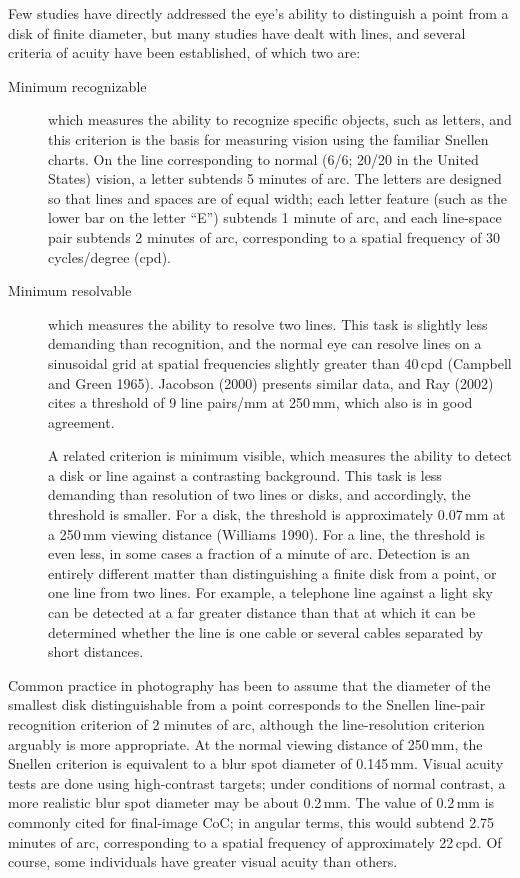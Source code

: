 \documentclass[11pt, oneside]{scrartcl}   	%
\begin{document}
Few studies have directly addressed the eye’s ability to distinguish a point from a disk of finite diameter, but many studies have dealt with lines, and several criteria of acuity have been established, of which two are:
\begin{description}
\item [Minimum recognizable] which measures the ability to recognize
  specific objects, such as letters, and this criterion is the basis
  for measuring vision using the familiar Snellen charts. On the line
  corresponding to normal (6/6; 20/20 in the United States) vision,
  a letter subtends 5 minutes of arc. The letters are designed so that
  lines and spaces are of equal width; each letter feature (such as
  the  lower bar on the letter “E”) subtends 1 minute of arc, and each
  line-space pair subtends 2 minutes of arc, corresponding to a
  spatial  frequency of 30\,cycles/degree (cpd).
\item [Minimum resolvable] which measures the ability to resolve two
  lines. This task is slightly less demanding than recognition, and
  the normal eye can resolve lines on a sinusoidal grid at spatial
  frequencies slightly greater than 40\,cpd (Campbell and Green 1965).
  Jacobson (2000) presents similar data, and Ray (2002) cites a
  threshold of 9 line pairs/mm at 250\,mm, which also is in good
  agreement.
  
A related criterion is minimum visible, which measures the ability to detect a disk or line against a contrasting background. This task is less demanding than resolution of two lines or disks, and accordingly, the threshold is smaller. For a disk, the threshold is approximately 0.07\,mm at a 250\,mm viewing distance (Williams 1990). For a line, the threshold is even less, in some cases a fraction of a minute of arc. Detection is an entirely different matter than distinguishing a finite disk from a point, or one line from two lines. For example, a telephone line against a light sky can be detected at a far greater distance than that at which it can be determined whether the line is one cable or several cables separated by short distances.

\end{description}
Common practice in photography has been to assume that the diameter of the smallest disk distinguishable from a point corresponds to the Snellen line-pair recognition criterion of 2 minutes of arc, although the line-resolution criterion arguably is more appropriate. At the normal viewing distance of 250\,mm, the Snellen criterion is equivalent to a blur spot diameter of 0.145\,mm. Visual acuity tests are done using high-contrast targets; under conditions of normal contrast, a more realistic blur spot diameter may be about 0.2\,mm. The value of 0.2\,mm is commonly cited for final-image CoC; in angular terms, this would subtend 2.75 minutes of arc, corresponding to a spatial frequency of approximately 22\,cpd. Of course, some individuals have greater visual acuity than others.
\end{document}
